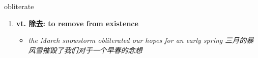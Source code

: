 
\begin{frame}
{\huge obliterate}
\begin{center}
\begin{enumerate}\Large
  \item \textbf{vt. 除去: to remove from existence}
  \begin{itemize}
    \item \em{\Large{the March snowstorm obliterated our hopes for an early spring 三月的暴风雪摧毁了我们对于一个早春的念想}}
  \end{itemize}
\end{enumerate}
\end{center}
\end{frame}
